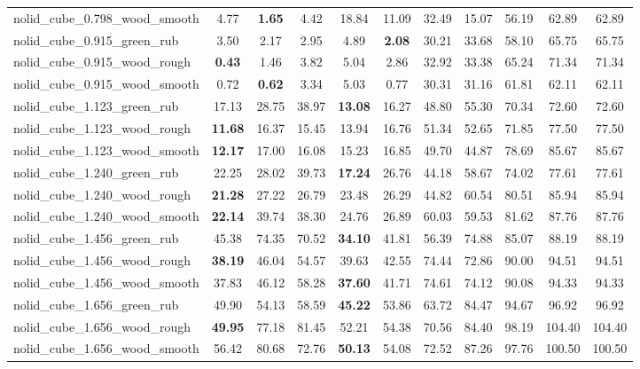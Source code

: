 \begin{table}[H]
{\begin{tabular}{l cccccccccc}
        nolid\_cube\_0.798\_wood\_smooth & 4.77 & \textbf{1.65} & 4.42 & 18.84 & 11.09 & 32.49 & 15.07 & 56.19 & 62.89 & 62.89 \\
        nolid\_cube\_0.915\_green\_rub & 3.50 & 2.17 & 2.95 & 4.89 & \textbf{2.08} & 30.21 & 33.68 & 58.10 & 65.75 & 65.75 \\
        nolid\_cube\_0.915\_wood\_rough & \textbf{0.43} & 1.46 & 3.82 & 5.04 & 2.86 & 32.92 & 33.38 & 65.24 & 71.34 & 71.34 \\
        nolid\_cube\_0.915\_wood\_smooth & 0.72 & \textbf{0.62} & 3.34 & 5.03 & 0.77 & 30.31 & 31.16 & 61.81 & 62.11 & 62.11 \\
        nolid\_cube\_1.123\_green\_rub & 17.13 & 28.75 & 38.97 & \textbf{13.08} & 16.27 & 48.80 & 55.30 & 70.34 & 72.60 & 72.60 \\
        nolid\_cube\_1.123\_wood\_rough & \textbf{11.68} & 16.37 & 15.45 & 13.94 & 16.76 & 51.34 & 52.65 & 71.85 & 77.50 & 77.50 \\
        nolid\_cube\_1.123\_wood\_smooth & \textbf{12.17} & 17.00 & 16.08 & 15.23 & 16.85 & 49.70 & 44.87 & 78.69 & 85.67 & 85.67 \\
        nolid\_cube\_1.240\_green\_rub & 22.25 & 28.02 & 39.73 & \textbf{17.24} & 26.76 & 44.18 & 58.67 & 74.02 & 77.61 & 77.61 \\
        nolid\_cube\_1.240\_wood\_rough & \textbf{21.28} & 27.22 & 26.79 & 23.48 & 26.29 & 44.82 & 60.54 & 80.51 & 85.94 & 85.94 \\
        nolid\_cube\_1.240\_wood\_smooth & \textbf{22.14} & 39.74 & 38.30 & 24.76 & 26.89 & 60.03 & 59.53 & 81.62 & 87.76 & 87.76 \\
        nolid\_cube\_1.456\_green\_rub & 45.38 & 74.35 & 70.52 & \textbf{34.10} & 41.81 & 56.39 & 74.88 & 85.07 & 88.19 & 88.19 \\
        nolid\_cube\_1.456\_wood\_rough & \textbf{38.19} & 46.04 & 54.57 & 39.63 & 42.55 & 74.44 & 72.86 & 90.00 & 94.51 & 94.51 \\
        nolid\_cube\_1.456\_wood\_smooth & 37.83 & 46.12 & 58.28 & \textbf{37.60} & 41.71 & 74.61 & 74.12 & 90.08 & 94.33 & 94.33 \\
        nolid\_cube\_1.656\_green\_rub & 49.90 & 54.13 & 58.59 & \textbf{45.22} & 53.86 & 63.72 & 84.47 & 94.67 & 96.92 & 96.92 \\
        nolid\_cube\_1.656\_wood\_rough & \textbf{49.95} & 77.18 & 81.45 & 52.21 & 54.38 & 70.56 & 84.40 & 98.19 & 104.40 & 104.40 \\
        nolid\_cube\_1.656\_wood\_smooth & 56.42 & 80.68 & 72.76 & \textbf{50.13} & 54.08 & 72.52 & 87.26 & 97.76 & 100.50 & 100.50 \\

\end{tabular}}
\end{table}
